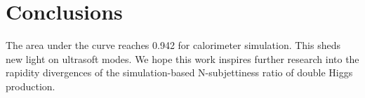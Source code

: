 \section{Conclusions}\label{sec:conclusions}

The area under the curve reaches 0.942 for calorimeter simulation. This
sheds new light on ultrasoft modes. We hope this work inspires further
research into the rapidity divergences of the simulation-based
N-subjettiness ratio of double Higgs production.

